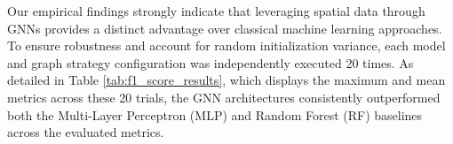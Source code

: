 \documentclass[runningheads]{llncs}
\begin{document}
Our empirical findings strongly indicate that leveraging spatial data through 
GNNs provides a distinct advantage over classical machine learning approaches. To ensure robustness and account for random initialization variance, each model and graph strategy configuration was independently executed 20 times. As detailed in Table \ref{tab:f1_score_results}, which displays the maximum and mean metrics across these 20 trials, the GNN architectures consistently outperformed both the Multi-Layer Perceptron (MLP) and Random Forest (RF) baselines across the evaluated metrics.


\end{document}
